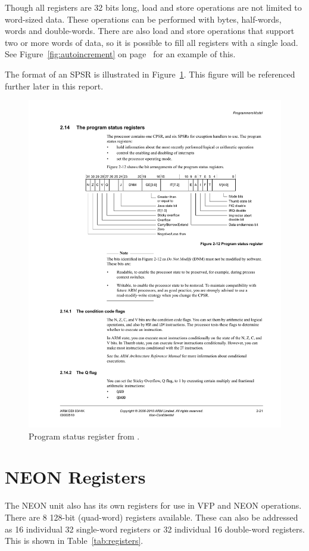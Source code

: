 \documentclass[oneside,a4paper]{report}
\begin{document}
Though all registers are 32 bits long, load and store operations are not limited to word-sized data. These operations can be performed with bytes, half-words, words and double-words. There are also load and store operations that support two or more words of data, so it is possible to fill all registers with a single load. See Figure~\ref{fig:autoincrement}  on page~\pageref{fig:autoincrement} for an example of this.

The format of an SPSR is illustrated in Figure~\ref{fig:cpsr}. This figure will be referenced further later in this report.

\begin{figure}[htb]
	\centering
	\includegraphics[width=1.0\textwidth]{./fig/CPSR.pdf}
	\caption{Program status register from \cite[p. 2-21]{A8Ref}.}
	\label{fig:cpsr}
\end{figure}

\section{NEON Registers}
The NEON unit also has its own registers for use in VFP and NEON operations. There are 8 128-bit (quad-word) registers available. These can also be addressed as 16 individual 32 single-word registers or 32 individual 16 double-word registers. This is shown in Table~\ref{tab:registers}.
\end{document}
